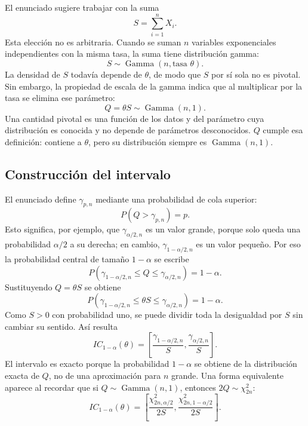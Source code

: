 \documentclass[10pt,a4paper,oneside]{article}
\begin{document}
El enunciado sugiere trabajar con la suma
\begin{equation*}
S=\sum_{i=1}^{n}X_i.
\end{equation*}
Esta elección no es arbitraria. Cuando se suman $n$ variables exponenciales independientes con la misma tasa, la suma tiene distribución gamma:
\begin{equation*}
S\sim\operatorname{Gamma}(n,\text{tasa }\theta).
\end{equation*}
La densidad de $S$ todavía depende de $\theta$, de modo que $S$ por sí sola no es pivotal. Sin embargo, la propiedad de escala de la gamma indica que al multiplicar por la tasa se elimina ese parámetro:
\begin{equation*}
Q=\theta S\sim\operatorname{Gamma}(n,1).
\end{equation*}
Una cantidad pivotal es una función de los datos y del parámetro cuya distribución es conocida y no depende de parámetros desconocidos. $Q$ cumple esa definición: contiene a $\theta$, pero su distribución siempre es $\operatorname{Gamma}(n,1)$.

\subsection*{Construcción del intervalo}

El enunciado define $\gamma_{p,n}$ mediante una probabilidad de cola superior:
\begin{equation*}
P(Q>\gamma_{p,n})=p.
\end{equation*}
Esto significa, por ejemplo, que $\gamma_{\alpha/2,n}$ es un valor grande, porque solo queda una probabilidad $\alpha/2$ a su derecha; en cambio, $\gamma_{1-\alpha/2,n}$ es un valor pequeño. Por eso la probabilidad central de tamaño $1-\alpha$ se escribe
\begin{equation*}
P\!\left(
\gamma_{1-\alpha/2,n}\leq Q\leq\gamma_{\alpha/2,n}
\right)=1-\alpha.
\end{equation*}
Sustituyendo $Q=\theta S$ se obtiene
\begin{equation*}
P\!\left(
\gamma_{1-\alpha/2,n}\leq \theta S\leq\gamma_{\alpha/2,n}
\right)=1-\alpha.
\end{equation*}
Como $S>0$ con probabilidad uno, se puede dividir toda la desigualdad por $S$ sin cambiar su sentido. Así resulta
\begin{equation}
\boxed{
IC_{1-\alpha}(\theta)=
\left[
\frac{\gamma_{1-\alpha/2,n}}{S},
\frac{\gamma_{\alpha/2,n}}{S}
\right].}
\label{eq:ic-exp-gamma}
\end{equation}
El intervalo es exacto porque la probabilidad $1-\alpha$ se obtiene de la distribución exacta de $Q$, no de una aproximación para $n$ grande. Una forma equivalente aparece al recordar que si $Q\sim\operatorname{Gamma}(n,1)$, entonces $2Q\sim\chi^2_{2n}$:
\begin{equation*}
IC_{1-\alpha}(\theta)=
\left[
\frac{\chi^2_{2n,\alpha/2}}{2S},
\frac{\chi^2_{2n,1-\alpha/2}}{2S}
\right].
\end{equation*}
\end{document}
